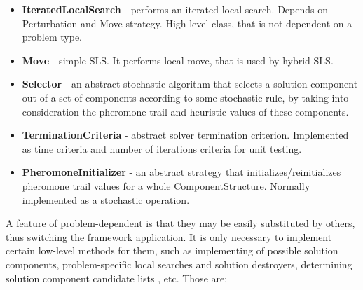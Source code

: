 \documentclass[11pt,a4paper,oneside]{book}
\begin{document}
\begin{itemize}
\item \textbf{IteratedLocalSearch} - performs an iterated local search. Depends on Perturbation and Move strategy. High level class, that is not dependent on a problem type.

\item \textbf{Move} - simple SLS. It performs local move, that is used by hybrid SLS.

\item \textbf{Selector} - an abstract stochastic algorithm that selects a solution component out of a set of components according to some stochastic rule, by taking into consideration the pheromone trail and heuristic values of these components.

\item \textbf{TerminationCriteria} - abstract solver termination criterion. Implemented as time criteria and number of iterations criteria for unit testing.

\item \textbf{PheromoneInitializer} - an abstract strategy that initializes/reinitializes pheromone trail values for a whole ComponentStructure. Normally implemented as a stochastic operation.

\end{itemize}

A feature of problem-dependent is that they may be easily substituted by others, thus switching the framework application. It is only necessary to implement certain low-level methods for them, such as implementing of possible solution components, problem-specific local searches and solution destroyers, determining solution component candidate lists , etc. Those are:
\end{document}
